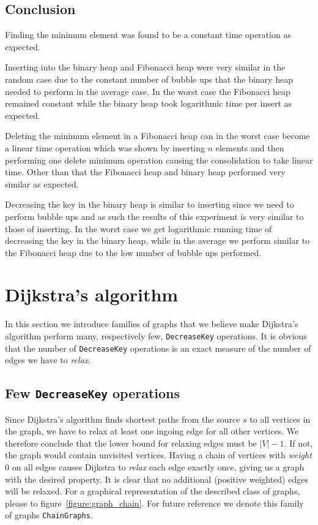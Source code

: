 \documentclass[a4paper,oneside,article,11pt]{memoir}
\begin{document}
\section{Conclusion}
Finding the minimum element was found to be a constant time operation as expected.

Inserting into the binary heap and Fibonacci heap were very similar in the random case due to the constant number of bubble ups that the binary heap needed to perform in the average case. In the worst case the Fibonacci heap remained constant while the binary heap took logarithmic time per insert as expected.

Deleting the minimum element in a Fibonacci heap can in the worst case become a linear time operation which was shown by inserting $n$ elements and then performing one delete minimum operation causing the consolidation to take linear time. Other than that the Fibonacci heap and binary heap performed very similar as expected.

Decreasing the key in the binary heap is similar to inserting since we need to perform bubble ups and as such the results of this experiment is very similar to those of inserting. In the worst case we get logarithmic running time of decreasing the key in the binary heap, while in the average we perform similar to the Fibonacci heap due to the low number of bubble ups performed.

\chapter{Dijkstra's algorithm}
\label{cpt:dijkstra}
In this section we introduce families of graphs that we believe make Dijkstra's algorithm perform many, respectively few, \texttt{DecreaseKey} operations. It is obvious that the number of \texttt{DecreaseKey} operations is an exact measure of the number of edges we have to \textit{relax}.

\section{Few \texttt{DecreaseKey} operations}
\label{sec:few_decreasekey}
Since Dijkstra's algorithm finds shortest paths from the source $s$ to all vertices in the graph, we have to relax at least one ingoing edge for all other vertices. We therefore conclude that the lower bound for relaxing edges must be $\vert V \vert -1$. If not, the graph would contain unvisited vertices. Having a chain of vertices with \textit{weight} 0 on all edges causes Dijkstra to \textit{relax} each edge exactly once, giving us a graph with the desired property. It is clear that no additional (positive weighted) edges will be relaxed. For a graphical representation of the described class of graphs, please to figure~\ref{figure:graph_chain}. For future reference we denote this family of graphs \texttt{ChainGraphs}.
\end{document}
